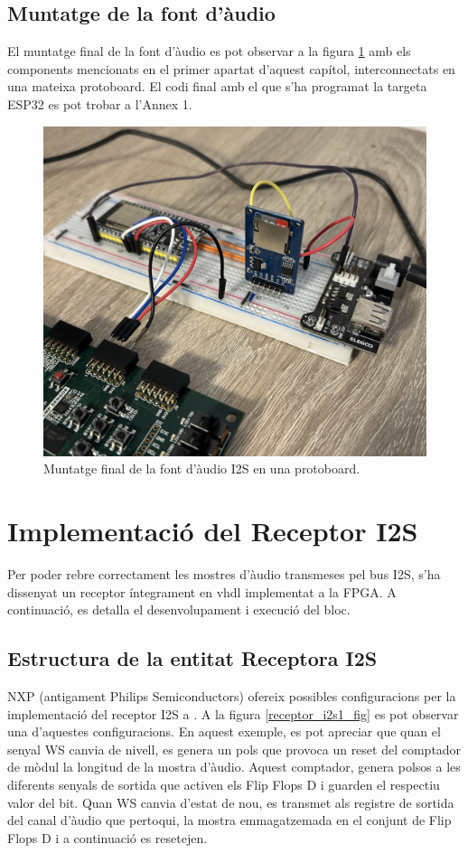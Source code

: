 \subsection{Muntatge de la font d'àudio}
\par El muntatge final de la font d'àudio es pot observar a la figura \ref{fig_fontaudioI2S} amb els components mencionats en el primer apartat d'aquest capítol, interconnectats en una mateixa protoboard. El codi final amb el que s'ha programat la targeta ESP32 es pot trobar a l'Annex 1.
\begin{figure}[H]
    \centering
    \includegraphics[width=0.4\linewidth]{Images/font_audio.jpg}
    \caption{Muntatge final de la font d'àudio I2S en una protoboard.}
    \label{fig_fontaudioI2S}
\end{figure}


 \section{Implementació del Receptor I2S}
 Per poder rebre correctament les mostres d'àudio transmeses pel bus I2S, s'ha dissenyat un receptor íntegrament en vhdl implementat a la FPGA. A continuació, es detalla el desenvolupament i execució del bloc.

 \subsection{Estructura de la entitat Receptora I2S}
 \par NXP (antigament Philips Semiconductors) ofereix possibles configuracions per la implementació del receptor I2S a \cite{I2S_manual}. A la figura \ref{receptor_i2s1_fig} es pot observar una d'aquestes configuracions. En aquest exemple, es pot apreciar que quan el senyal WS canvia de nivell, es genera un pols que provoca un reset del comptador de mòdul la longitud de la mostra d'àudio. Aquest comptador, genera polsos a les diferents senyals de sortida que activen els Flip Flops D i guarden el respectiu valor del bit. Quan WS canvia d'estat de nou, es transmet als registre de sortida del canal d'àudio que pertoqui, la mostra emmagatzemada en el conjunt de Flip Flops D i a continuació es resetejen. 

